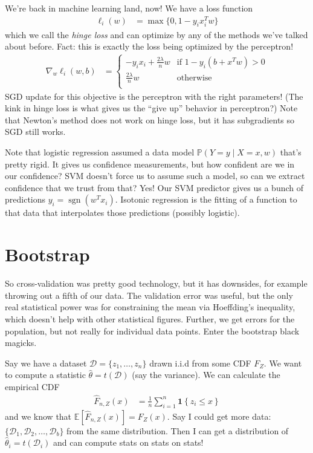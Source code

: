 \documentclass[11pt,letterpaper]{article}
\DeclareMathOperator{\sgn}{sgn}
\theoremstyle{definition}
\numberwithin{equation}{section}
\numberwithin{figure}{section}
\begin{document}
We're back in machine learning land, now! We have a loss function
%
\begin{align}
	\ell_i(w) &= \max\{0, 1 - y_i x_i^T w\}
\end{align}
%
which we call the \emph{hinge loss} and can optimize by any of the methods we've talked about before. Fact: this is exactly the loss being optimized by the perceptron!
%
\begin{align}
	\nabla_w \ell_i(w,b) &= \left\{
	\begin{array}{ll}
		-y_i x_i + \frac{2\lambda}{n} w & \text{if } 1-y_i(b+x^T w) > 0\\
		\frac{2\lambda}{n} w & \text{otherwise}\\
	\end{array}\right.	
\end{align}
%
SGD update for this objective is the perceptron with the right parameters! (The kink in hinge loss is what gives us the ``give up'' behavior in perceptron?) Note that Newton's method does not work on hinge loss, but it has subgradients so SGD still works.


Note that logistic regression assumed a data model $\mathbb{P}(Y=y \mid X=x, w)$ that's pretty rigid. It gives us confidence measurements, but how confident are we in our confidence? SVM doesn't force us to assume such a model, so can we extract confidence that we trust from that? Yes! Our SVM predictor gives us a bunch of predictions $y_i = \sgn(w^T x_i)$. Isotonic regression is the fitting of a function to that data that interpolates those predictions (possibly logistic).






\section{Bootstrap}
So cross-validation was pretty good technology, but it has downsides, for example throwing out a fifth of our data. The validation error was useful, but the only real statistical power was for constraining the mean via Hoeffding's inequality, which doesn't help with other statistical figures. Further, we get errors for the population, but not really for individual data points. Enter the bootstrap black magicks.

Say we have a dataset $\mathcal{D} = \{z_1,\ldots,z_n\}$ drawn i.i.d from some CDF $F_Z$. We want to compute a statistic $\hat{\theta} = t(\mathcal{D})$ (say the variance). We can calculate the empirical CDF
%
\begin{align}
	\hat{F}_{n,Z}(x) &= \frac{1}{n} \sum_{i=1}^n \bm{1}\left\{z_i \leq x\right\}
\end{align}
%
and we know that $\mathbb{E}\left[\hat{F}_{n,Z}(x)\right] = F_Z(x)$. Say I could get more data: $\{\mathcal{D}_1,\mathcal{D}_2,\ldots,\mathcal{D}_b\}$ from the same distribution. Then I can get a distribution of $\hat{\theta}_i = t(\mathcal{D}_i)$ and can compute stats on stats on stats!
\end{document}
